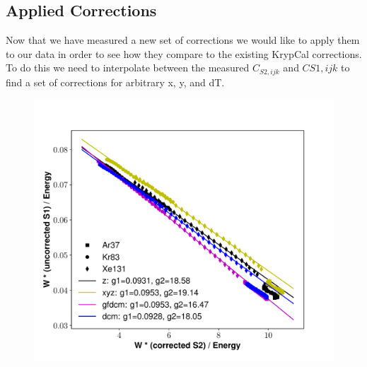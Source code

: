 \subsection{Applied Corrections}
Now that we have measured a new set of corrections we would like to apply them to our data in order to see how they compare to the existing KrypCal corrections. To do this we need to interpolate between the measured $C_{S2,ijk}$ and $C{S1,ijk}$ to find a set of corrections for arbitrary x, y, and dT.
\begin{figure}[h!]
\centering
\includegraphics[width=150mm]{Figures/dt_doke_plot.pdf}
\caption{}
\label{fig:dt_doke_plot} 
\end{figure}


